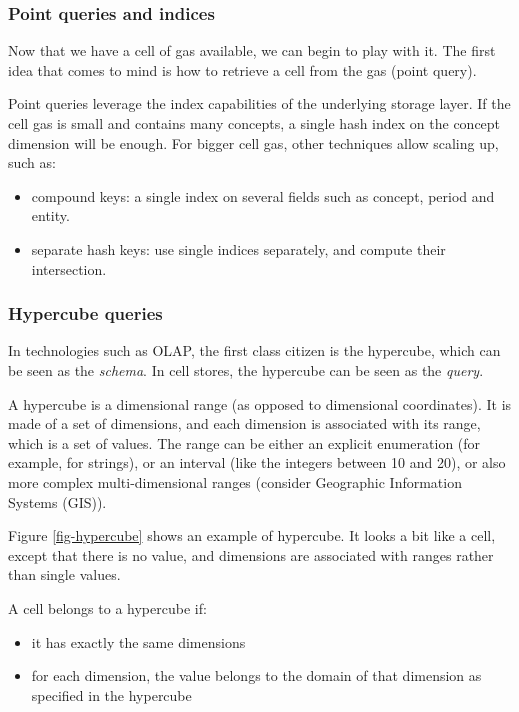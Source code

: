 \documentclass{acm_proc_article-sp}
\begin{document}
\subsubsection{Point queries and indices}

Now that we have a cell of gas available, we can begin to play with it. The first idea that comes to mind is how to retrieve a cell from the gas (point query).

Point queries leverage the index capabilities of the underlying storage layer. If the cell gas is small and contains many concepts, a single hash index on the concept dimension will be enough. For bigger cell gas, other techniques allow scaling up, such as:
\begin{itemize}
\item compound keys: a single index on several fields such as concept, period and entity.
\item separate hash keys: use single indices separately, and compute their intersection.
\end{itemize}

\subsubsection{Hypercube queries}
In technologies such as OLAP, the first class citizen is the hypercube, which can be seen as the \emph{schema}. In cell stores, the hypercube can be seen as the \emph{query}.

A hypercube is a dimensional range (as opposed to dimensional coordinates). It is made of a set of dimensions, and each dimension is associated with its range, which is a set of values. The range can be either an explicit enumeration (for example, for strings), or an interval (like the integers between 10 and 20), or also more complex multi-dimensional ranges (consider Geographic Information Systems (GIS)).

Figure \ref{fig-hypercube} shows an example of hypercube. It looks a bit like a cell, except that there is no value, and dimensions are associated with ranges rather than single values.

A cell belongs to a hypercube if:

\begin{itemize}
\item it has exactly the same dimensions
\item for each dimension, the value belongs to the domain of that dimension as specified in the hypercube
\end{itemize}
\end{document}
